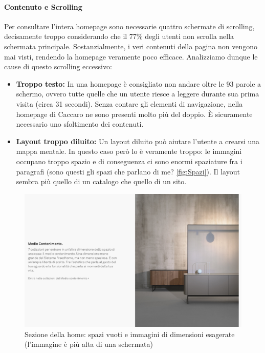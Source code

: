 \paragraph*{Contenuto e Scrolling}
\label{par:Scrolling}
Per consultare l'intera homepage sono necessarie quattro schermate di scrolling, decisamente troppo considerando che il 77\% degli utenti non scrolla nella schermata principale. Sostanzialmente, i veri contenuti della pagina non vengono mai visti, rendendo la homepage veramente poco efficace.\newline
Analizziamo dunque le cause di questo scrolling eccessivo:
\begin{itemize}
	\item \textbf{Troppo testo:} In una homepage è consigliato non andare oltre le 93 parole a schermo, ovvero tutte quelle che un utente riesce a leggere durante sua prima visita (circa 31 secondi). Senza contare gli elementi di navigazione, nella homepage di Caccaro ne sono presenti molto più del doppio. \`E sicuramente necessario uno sfoltimento dei contenuti.
	\item \textbf{Layout troppo diluito:} Un layout diluito può aiutare l'utente a crearsi una mappa mentale. In questo caso però lo è veramente troppo: le immagini occupano troppo spazio e di conseguenza ci sono enormi spaziature fra i paragrafi (sono questi gli spazi che parlano di me? \autoref{fig:Spazi}). Il layout sembra più quello di un catalogo che quello di un sito.
\end{itemize}

\begin{figure}[H]
	\centering
	\includegraphics[width=\textwidth]{sez/HomePage/img/Spazi.png}
	\caption[https://www.caccaro.com/]{Sezione della home: spazi vuoti e immagini di dimensioni esagerate (l'immagine è più alta di una schermata)}
	\label{fig:Spazi}
\end{figure}

